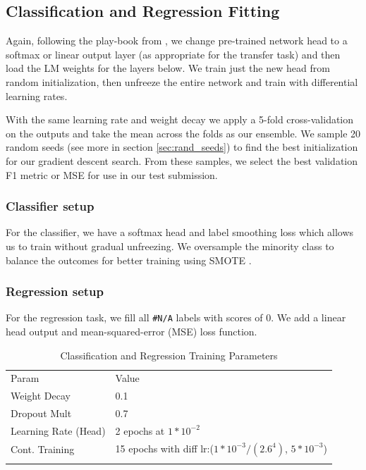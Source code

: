 \documentclass[smallextended]{svjour3}       %
\begin{document}
\subsection{Classification and Regression Fitting}
Again, following the play-book from \cite{HowardRuder:DBLP:journals/corr/abs-1801-06146}, we change pre-trained network head to a softmax or linear output layer (as appropriate for the transfer task) and then load the LM weights for the layers below.  We train just the new head from random initialization, then unfreeze the entire network and train with differential learning rates.

With the same learning rate and weight decay we apply a 5-fold cross-validation on the outputs and take the mean across the folds as our ensemble.  We sample 20 random seeds (see more in section \ref{sec:rand_seeds}) to find the best initialization for our gradient descent search.  From these samples, we select the best validation F1 metric or MSE for use in our test submission.
\subsubsection{Classifier setup}  For the classifier, we have a softmax head and label smoothing loss which allows us to train without gradual unfreezing.  We oversample the minority class to balance the outcomes for better training using SMOTE \cite{Chawla:2002:SSM:1622407.1622416}.  
\subsubsection{Regression setup}  For the regression task, we fill all \verb|#N/A| labels with scores of 0.  We add a linear head output and mean-squared-error (MSE) loss function. 

\begin{table}[ht]
	\caption{Classification and Regression Training Parameters}
	\label{tab:clas_training}       %
	\begin{tabular}{ll}
		\hline\noalign{\smallskip}
		Param & Value \\
		\noalign{\smallskip}\hline\noalign{\smallskip}
		Weight Decay & 0.1  \\
		Dropout Mult &  0.7 \\
		Learning Rate (Head)& 2 epochs at $1*10^{-2}$\\
		Cont. Training & 15 epochs with diff lr:($1*10^{-3}/(2.6^4)$, $5*10^{-3}$)\\
		\noalign{\smallskip}\hline
	\end{tabular}
\end{table}
\end{document}
